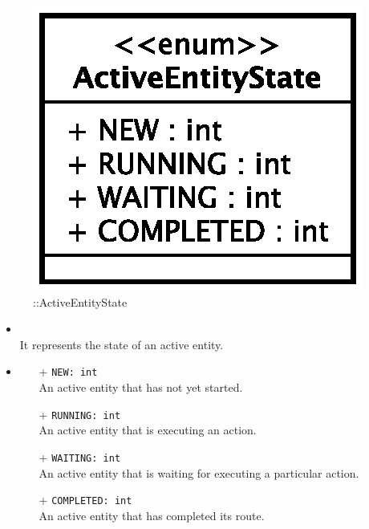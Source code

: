 \begin{figure}[h]
\centering
\includegraphics[scale=0.6,keepaspectratio]{images/solution/app/backend/active_entity_state.eps}
\caption{\pReactiveComponentStretchDecoration::ActiveEntityState}
\label{fig:sd-app-active-entity-state}
\end{figure}
\FloatBarrier
\begin{itemize}
  \item \textbf{\descr} \\
    It represents the state of an active entity.
  \item \textbf{}
  \begin{itemize}
    \item[+] \texttt{NEW: int} \\
    An active entity that has not yet started.
    \item[+] \texttt{RUNNING: int} \\
    An active entity that is executing an action.
    \item[+] \texttt{WAITING: int} \\
    An active entity that is waiting for executing a particular action.
    \item[+] \texttt{COMPLETED: int} \\
    An active entity that has completed its route.
  \end{itemize}
\end{itemize}